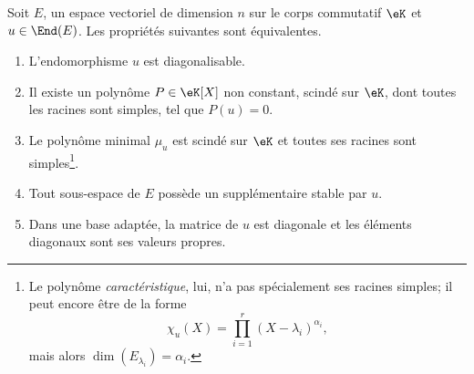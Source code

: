\begin{theorem}     \label{ThoDigLEQEXR}
	Soit \( E\), un espace vectoriel de dimension \( n\) sur le corps commutatif \( \eK\) et \( u\in\End(E)\). Les propriétés suivantes sont équivalentes.
	\begin{enumerate}
		\item       \label{ItemThoDigLEQEXRiv}
		      L'endomorphisme \( u\) est diagonalisable.
		\item       \label{ItemThoDigLEQEXRi}
		      Il existe un polynôme \( P\in\eK[X]\) non constant, scindé sur \(\eK\), dont toutes les racines sont simples, tel que \( P(u)=0\).
		\item       \label{ItemThoDigLEQEXRii}
		      Le polynôme minimal \( \mu_u\) est scindé sur \(\eK\) et toutes ses racines sont simples\footnote{Le polynôme \emph{caractéristique}, lui, n'a pas spécialement ses racines simples; il peut encore être de la forme
			      \begin{equation}
				      \chi_u(X)=\prod_{i=1}^r(X-\lambda_i)^{\alpha_i},
			      \end{equation}
			      mais alors \( \dim(E_{\lambda_i})=\alpha_i\). }.
		\item       \label{ItemThoDigLEQEXRiii}
		      Tout sous-espace de \( E\) possède un supplémentaire stable par \( u\).
		\item       \label{ITEMooZNJFooEiqDYp}
		      Dans une base adaptée, la matrice de \( u\) est diagonale et les éléments diagonaux sont ses valeurs propres.
	\end{enumerate}
\end{theorem}

